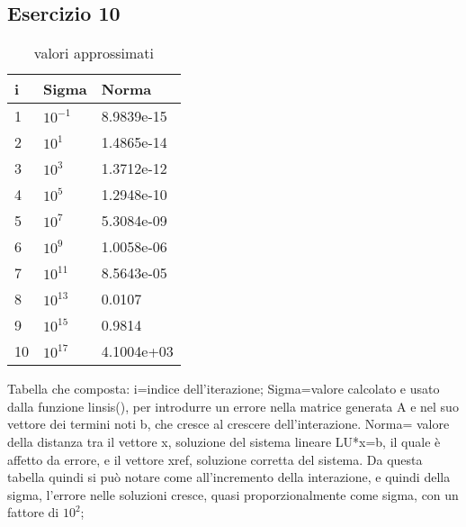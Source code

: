 \subsection{Esercizio 10}

\begin{table}[h]
\begin{tabular}{|l l l|}
        \hline
        i & Sigma  &  Norma\\
        \hline
        1 & $10^{-1}$  &  8.9839e-15\\
        2 & $10^{1}$ &  1.4865e-14 \\
        3 & $10^{3}$ &  1.3712e-12 \\
        4 & $10^{5}$ &  1.2948e-10 \\
        5 & $10^{7}$ &  5.3084e-09 \\
        6 & $10^{9}$ &  1.0058e-06 \\
        7 & $10^{11}$ &  8.5643e-05 \\
        8 & $10^{13}$ &  0.0107 \\
        9 & $10^{15}$ &  0.9814 \\
        10 & $10^{17}$ & 4.1004e+03\\
        \hline
\end{tabular}
\caption{valori approssimati}
\label{tab::1}     
\end{table}
Tabella che composta:
	i=indice dell'iterazione;
	Sigma=valore calcolato e usato dalla funzione linsis(), per introdurre un errore nella matrice generata A e nel suo vettore dei termini noti b, che cresce al crescere dell'interazione.
	Norma= valore della distanza tra il vettore x, soluzione del sistema lineare LU*x=b, il quale è affetto da errore, e il vettore xref, soluzione corretta del sistema.
Da questa tabella quindi si può notare come all'incremento della interazione, e quindi della sigma, l'errore nelle soluzioni  cresce, quasi proporzionalmente come sigma, con un fattore di $10^{2}$;
